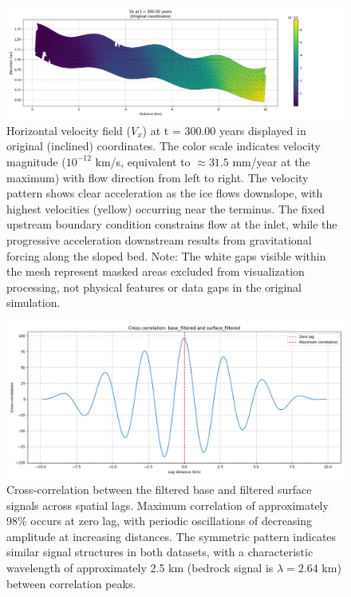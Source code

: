 \begin{figure}
    \includegraphics[scale=0.45]{Vx_300yrs_xz.png}
    \caption{Horizontal velocity field ($V_x$) at t = 300.00 years displayed in original (inclined) coordinates. The color scale indicates velocity magnitude ($10^{-12}$ km/s, equivalent to $\approx 31.5$ mm/year at the maximum) with flow direction from left to right. The velocity pattern shows clear acceleration as the ice flows downslope, with highest velocities (yellow) occurring near the terminus. The fixed upstream boundary condition  constrains flow at the inlet, while the progressive acceleration downstream results from gravitational forcing along the sloped bed. Note: The white gaps visible within the mesh represent masked areas excluded from visualization processing, not physical features or data gaps in the original simulation.}
    \label{fig:Vx}
\end{figure}

\begin{figure}
    \includegraphics[scale=0.5]{xcorr_filtered.png}
    \caption{Cross-correlation between the filtered base and filtered surface signals across spatial lags. Maximum correlation of approximately 98\% occurs at zero lag, with periodic oscillations of decreasing amplitude at increasing distances. The symmetric pattern indicates similar signal structures in both datasets, with a characteristic wavelength of approximately 2.5 km (bedrock signal is $\lambda = 2.64$ km) between correlation peaks.}
    \label{fig:xcorr_filtered}
\end{figure}

